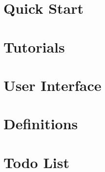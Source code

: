 \documentclass{book}
\begin{document}
\chapter{Quick Start}
\label{quick_start}
\hypertarget{quick_start}{}

\chapter{Tutorials}
\label{tutorials}
\hypertarget{tutorials}{}

\chapter{User Interface}
\label{user_interface}
\hypertarget{user_interface}{}

\chapter{Definitions}
\label{definitions}
\hypertarget{definitions}{}

\chapter{Todo List}
\label{todo}
\hypertarget{todo}{}

\printindex
\end{document}
